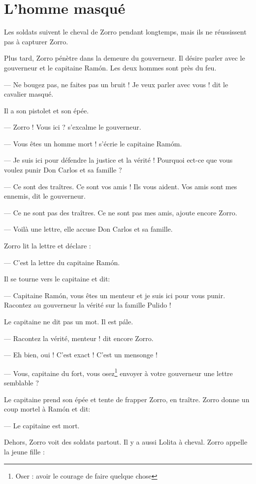 \chapter{L'homme masqué}
Les soldats suivent le cheval de Zorro pendant longtemps, mais ils ne réussissent pas à capturer Zorro.

Plus tard, Zorro pénètre dans la demeure du gouverneur. Il désire parler avec le gouverneur et le capitaine Ramón. Les deux
hommes sont près du feu.

--- Ne bougez pas, ne faites pas un bruit ! Je veux parler avec vous ! dit le cavalier masqué.

Il a son pistolet et son épée.

--- Zorro ! Vous ici ? s'excalme le gouverneur.

--- Vous êtes un homme mort ! s'écrie le capitaine Ramóm.

--- Je suis ici pour défendre la justice et la vérité ! Pourquoi ect-ce que vous voulez punir Don Carlos et sa famille ?

--- Ce sont des traîtres. Ce sont vos amis ! Ils vous aident. Vos amis sont mes ennemis, dit le gouverneur.

--- Ce ne sont pas des traîtres. Ce ne sont pas mes amis, ajoute encore Zorro.

--- Voilà une lettre, elle accuse Don Carlos et sa famille.

Zorro lit la lettre et déclare :

--- C'est la lettre du capitaine Ramón.

Il se tourne vers le capitaine et dit:

--- Capitaine Ramón, vous êtes un menteur et je suis ici pour vous punir. Racontez au gouverneur la vérité sur la famille Pulido !

Le capitaine ne dit pas un mot. Il est pále.

--- Racontez la vérité, menteur ! dit encore Zorro.

--- Eh bien, oui ! C'est exact ! C'est un mensonge !

--- Vous, capitaine du fort, vous osez\footnote{Oser : avoir le courage de faire quelque chose} envoyer à votre gouverneur une
    lettre semblable ?

Le capitaine prend son épée et tente de frapper Zorro, en traître. Zorro donne un coup mortel à Ramón et dit:

--- Le capitaine est mort.

Dehors, Zorro voit des soldats partout. Il y a aussi Lolita à cheval. Zorro appelle la jeune fille :

